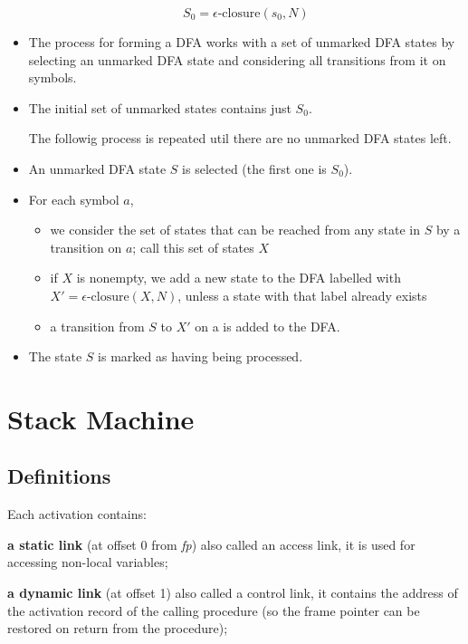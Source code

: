 \documentclass[fontsize=10pt,a4paper]{article}
\begin{document}
\begin{multicols}{3}
\begin{itemize}
        \[S_0 = \epsilon\text{-closure}(s_0, N)\]

        \item The process for forming a DFA works with a set of unmarked DFA states by selecting an unmarked DFA state and considering all transitions from it on symbols.

        \item The initial set of unmarked states contains just $S_0$.

        The followig process is repeated util there are no unmarked DFA states left.

        \item An unmarked DFA state $S$ is selected (the first one is $S_0$).

        \item For each symbol $a$,

        \begin{itemize}
            \item we consider the set of states that can be reached from any state in $S$ by a transition on $a$; call this set of states $X$
            \item if $X$ is nonempty, we add a new state to the DFA labelled with $X' = \epsilon\text{-closure}(X, N)$, unless a state with that label already exists
            \item a transition from $S$ to $X'$ on a is added to the DFA.
        \end{itemize}

        \item The state $S$ is marked as having being processed.

    \end{itemize}

    \section{Stack Machine}

    \subsection{Definitions}

    Each activation contains:

    \textbf{a static link} (at offset 0 from \textit{fp}) also called an access link, it is used for accessing non-local variables;

    \textbf{a dynamic link} (at offset 1) also called a control link, it contains the address of the activation record of the calling procedure (so the frame pointer can be restored on return from the procedure);


\end{multicols}
\end{document}
